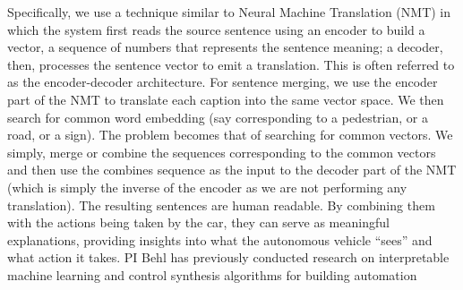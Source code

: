 Specifically, we use a technique similar to Neural Machine Translation (NMT) in which the system first reads the source sentence using an encoder to build a vector, a sequence of numbers that represents the sentence meaning; a decoder, then, processes the sentence vector to emit a translation.
This is often referred to as the encoder-decoder architecture. 
For sentence merging, we use the encoder part of the NMT to translate each caption into the same vector space. 
We then search for common word embedding (say corresponding to a pedestrian, or a road, or a sign). The problem becomes that of searching for common vectors. We simply, merge or combine the sequences corresponding to the common vectors and then use the combines sequence as the input to the decoder part of the NMT (which is simply the inverse of the encoder as we are not performing any translation). 
The resulting sentences are human readable.
By combining them with the actions being taken by the car, they can serve as meaningful explanations, providing insights into what the autonomous vehicle ``sees'' and what action it takes. 
PI Behl has previously conducted research on interpretable machine learning and control synthesis algorithms for building automation~\cite{behl2016interactive,jain2017data}